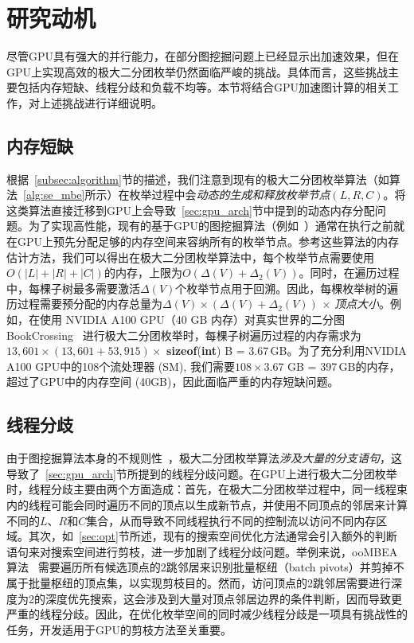 \section{研究动机}

尽管GPU具有强大的并行能力，在部分图挖掘问题上已经显示出加速效果，但在GPU上实现高效的极大二分团枚举仍然面临严峻的挑战。具体而言，这些挑战主要包括内存短缺、线程分歧和负载不均等。本节将结合GPU加速图计算的相关工作，对上述挑战进行详细说明。

\subsection{内存短缺}
根据~\ref{subsec:algorithm}节的描述，我们注意到现有的极大二分团枚举算法（如算法~\ref{alg:se_mbe}所示）在枚举过程中会\emph{动态的生成和释放枚举节点$(L,R,C)$}。将这类算法直接迁移到GPU上会导致~\ref{sec:gpu_arch}节中提到的动态内存分配问题。为了实现高性能，现有的基于GPU的图挖掘算法（例如~\cite{MCE-GPU21,Kclique22,g2miner22,Graphset23}）通常在执行之前就在GPU上预先分配足够的内存空间来容纳所有的枚举节点。参考这些算法的内存估计方法，我们可以得出在极大二分团枚举算法中，每个枚举节点需要使用$O(|L|+|R|+|C|)$的内存，上限为$O(\Delta(V) + \Delta_2(V))$。同时，在遍历过程中，每棵子树最多需要激活$\Delta(V)$个枚举节点用于回溯。因此，每棵枚举树的遍历过程需要预分配的内存总量为$\Delta(V) \times (\Delta(V) + \Delta_2(V))$ $\times$ \textit{顶点大小}。例如，在使用 NVIDIA A100 GPU（40 GB 内存）对真实世界的二分图 BookCrossing~\cite{konect} 进行极大二分团枚举时，每棵子树遍历过程的内存需求为$13,601 \times (13,601 + 53,915) \times$ \textbf{sizeof}(\textbf{int}) B = 3.67\,GB。为了充分利用NVIDIA A100 GPU中的108个流处理器 (SM), 我们需要$108 \times 3.67$ GB = 397\,GB的内存，超过了GPU中的内存空间 (40GB)，因此面临严重的内存短缺问题。

\subsection{线程分歧}
\label{subsec:gmbe_thread_divergence}

由于图挖掘算法本身的不规则性~\cite{Irregularity12}，极大二分团枚举算法\emph{涉及大量的分支语句}，这导致了~\ref{sec:gpu_arch}节所提到的线程分歧问题。在GPU上进行极大二分团枚举时，线程分歧主要由两个方面造成：首先，在极大二分团枚举过程中，同一线程束内的线程可能会同时遍历不同的顶点以生成新节点，并使用不同顶点的邻居来计算不同的$L$、$R$和$C$集合，从而导致不同线程执行不同的控制流以访问不同内存区域。其次，如~\ref{sec:opt}节所述，现有的搜索空间优化方法通常会引入额外的判断语句来对搜索空间进行剪枝，进一步加剧了线程分歧问题。举例来说，ooMBEA算法~\cite{ooMBE22} 需要遍历所有候选顶点的2跳邻居来识别批量枢纽（batch pivots）并剪掉不属于批量枢纽的顶点集，以实现剪枝目的。然而，访问顶点的2跳邻居需要进行深度为2的深度优先搜索，这会涉及到大量对顶点邻居边界的条件判断，因而导致更严重的线程分歧。因此，在优化枚举空间的同时减少线程分歧是一项具有挑战性的任务，开发适用于GPU的剪枝方法至关重要。


